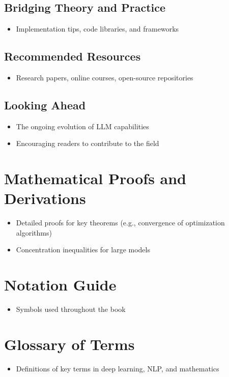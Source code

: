 \documentclass[12pt]{book}
\begin{document}
\section{Bridging Theory and Practice}
\begin{itemize}
    \item Implementation tips, code libraries, and frameworks
\end{itemize}

\section{Recommended Resources}
\begin{itemize}
    \item Research papers, online courses, open-source repositories
\end{itemize}

\section{Looking Ahead}
\begin{itemize}
    \item The ongoing evolution of LLM capabilities
    \item Encouraging readers to contribute to the field
\end{itemize}


\appendix
\chapter{Mathematical Proofs and Derivations}
\begin{itemize}
    \item Detailed proofs for key theorems (e.g., convergence of optimization algorithms)
    \item Concentration inequalities for large models
\end{itemize}

\chapter{Notation Guide}
\begin{itemize}
    \item Symbols used throughout the book
\end{itemize}

\chapter{Glossary of Terms}
\begin{itemize}
    \item Definitions of key terms in deep learning, NLP, and mathematics
\end{itemize}
\end{document}
